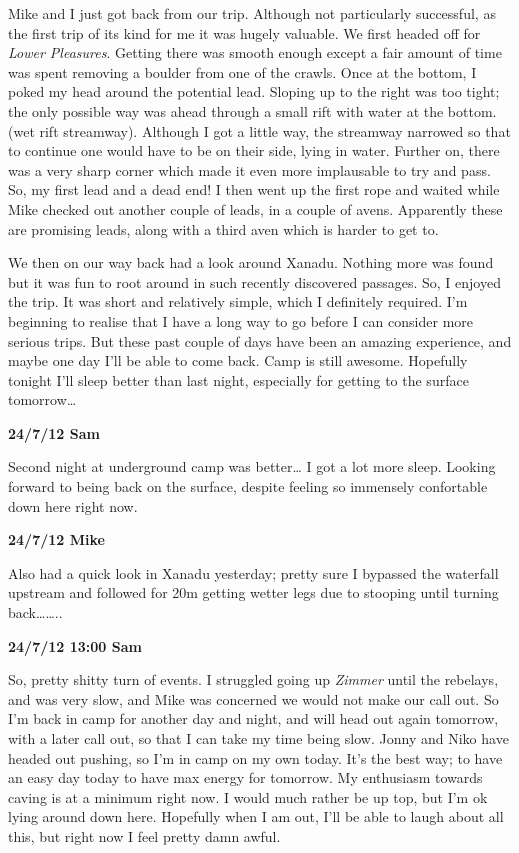 Mike and I just got back from our trip. Although not particularly
successful, as the first trip of its kind for me it was hugely valuable.
We first headed off for \emph{Lower Pleasures}. Getting there was smooth
enough except a fair amount of time was spent removing a boulder from
one of the crawls. Once at the bottom, I poked my head around the
potential lead. Sloping up to the right was too tight; the only possible
way was ahead through a small rift with water at the bottom. (wet rift
streamway). Although I got a little way, the streamway narrowed so that
to continue one would have to be on their side, lying in water. Further
on, there was a very sharp corner which made it even more implausable to
try and pass. So, my first lead and a dead end! I then went up the first
rope and waited while Mike checked out another couple of leads, in a
couple of avens. Apparently these are promising leads, along with a
third aven which is harder to get to.

We then on our way back had a look around Xanadu. Nothing more was found
but it was fun to root around in such recently discovered passages. So,
I enjoyed the trip. It was short and relatively simple, which I
definitely required. I'm beginning to realise that I have a long way to
go before I can consider more serious trips. But these past couple of
days have been an amazing experience, and maybe one day I'll be able to
come back. Camp is still awesome. Hopefully tonight I'll sleep better
than last night, especially for getting to the surface tomorrow\ldots{}

\textbf{24/7/12 Sam}

Second night at underground camp was better\ldots{} I got a lot more
sleep. Looking forward to being back on the surface, despite feeling so
immensely confortable down here right now.

\textbf{24/7/12 Mike}

Also had a quick look in Xanadu yesterday; pretty sure I bypassed the
waterfall upstream and followed for 20m getting wetter legs due to
stooping until turning back\ldots{}\ldots{}..

\textbf{24/7/12 13:00 Sam}

So, pretty shitty turn of events. I struggled going up \emph{Zimmer}
until the rebelays, and was very slow, and Mike was concerned we would
not make our call out. So I'm back in camp for another day and night,
and will head out again tomorrow, with a later call out, so that I can
take my time being slow. Jonny and Niko have headed out pushing, so I'm
in camp on my own today. It's the best way; to have an easy day today to
have max energy for tomorrow. My enthusiasm towards caving is at a
minimum right now. I would much rather be up top, but I'm ok lying
around down here. Hopefully when I am out, I'll be able to laugh about
all this, but right now I feel pretty damn awful.

